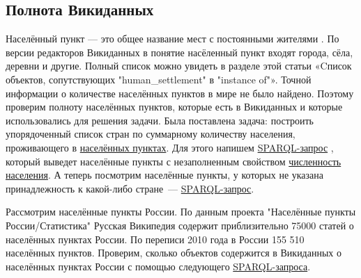 \subsection{Полнота Викиданных}

Населённый пункт — это общее название мест с постоянными жителями \protect\footnotemark.  По версии редакторов Викиданных в понятие насёленный пункт входят города, сёла, деревни и другие. Полный список можно увидеть в разделе этой статьи «Cписок объектов, сопутствующих "human\_settlement" в "instance of"». Точной информации о количестве населённых пунктов в мире не было найдено. Поэтому проверим полноту населённых пунктов, которые есть в Викиданных и которые использовались для решения задачи. Была поставлена задача: построить упорядоченный список стран по суммарному количеству населения, проживающего в \href{http://www.wikidata.org/entity/Q486972}{населённых пунктах}. Для этого напишем \href{https://w.wiki/4FUz}{SPARQL-запрос} \protect\footnotemark, который выведет населённые пункты с незаполненным свойством \href{http://www.wikidata.org/entity/P1082}{численность населения}. 
А теперь посмотрим населённые пункты, у которых не указана принадлежность к какой-либо стране~--- \href{https://w.wiki/4FV8}{SPARQL-запрос}\protect\footnotemark.


Рассмотрим населённые пункты России. По данным проекта "Населённые пункты России/Статистика" Русская Википедия содержит приблизительно 75000 статей о населённых пунктах России. По переписи 2010 года в России 155 510 населённых пунктов. Проверим, сколько объектов содержится в Викиданных о населённых пунктах России с помощью следующего \href{https://w.wiki/4FVE}{SPARQL-запроса}\protect\footnotemark. 


